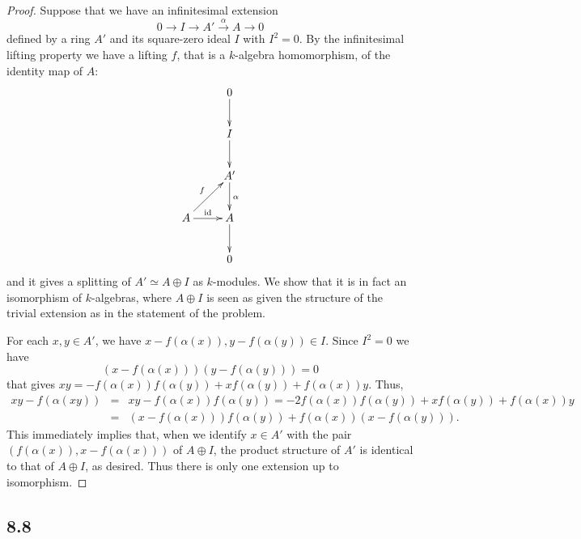 \documentclass[11pt]{amsart}          %
\begin{document}
\begin{proof}Suppose that we have an infinitesimal extension
$$0 \to I \to A' \overset{\alpha}{\to}  A\to 0$$ defined by a ring $A'$ and its square-zero ideal $I$ with $I^2 =0$. By the infinitesimal lifting property we have a lifting $f$, that is a $k$-algebra homomorphism, of the identity map of $A$:
$$\xymatrix{ & 0 \ar[d] \\ & I \ar[d] \\ & A' \ar[d] ^{\alpha} \\ A \ar[ru] ^f \ar[r] ^{\rm id} & A \ar[d] \\ & 0}$$ and it gives a splitting of $A' \simeq A \oplus I$ as $k$-modules. We show that it is in fact an isomorphism of $k$-algebras, where $A \oplus I$ is seen as given the structure of the trivial extension as in the statement of the problem.

For each $x, y \in A'$, we have $x - f (\alpha (x)), y - f (\alpha (y)) \in I$. Since $I^2 = 0$ we have 
$$ (x- f(\alpha(x))) (y - f(\alpha (y)) )=0$$ that gives $xy = - f(\alpha (x)) f(\alpha (y)) + x f(\alpha (y)) + f (\alpha (x)) y$. Thus,
\begin{eqnarray*}
xy- f(\alpha (xy)) &=& xy - f(\alpha (x)) f(\alpha (y)) = - 2 f(\alpha (x))f(\alpha (y)) + x f(\alpha (y)) + f(\alpha (x)) y\\
&=& (x - f (\alpha (x))) f (\alpha (y)) + f (\alpha (x)) (x- f (\alpha (y))).
\end{eqnarray*}
This immediately implies that, when we identify $x \in A'$ with the pair $\left( f(\alpha (x)), x - f(\alpha (x)) \right)$ of $ A \oplus I$, the product structure of $A'$ is identical to that of $A \oplus I$, as desired. Thus there is only one extension up to isomorphism.
\end{proof}

\subsection*{8.8}
\end{document}

